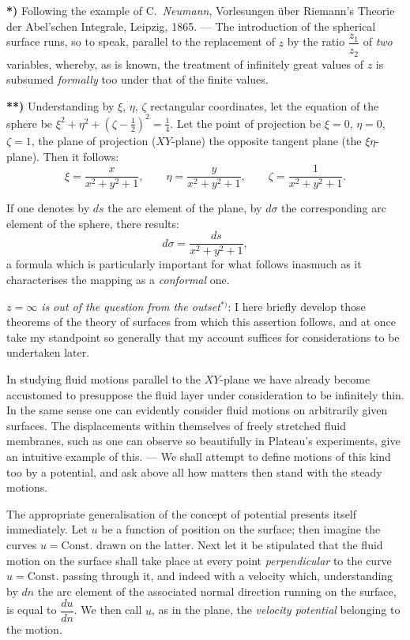 \documentclass{article}
\begin{document}
\textbf{*)} Following the example of C.\ \emph{Neumann}, Vorlesungen über Riemann's Theorie der Abel'schen Integrale, Leipzig, 1865. --- The introduction of the spherical surface runs, so to speak, parallel to the replacement of $z$ by the ratio $\dfrac{z_{1}}{z_{2}}$ of \emph{two} variables, whereby, as is known, the treatment of infinitely great values of $z$ is subsumed \emph{formally} too under that of the finite values.

\textbf{**)} Understanding by $\xi$, $\eta$, $\zeta$ rectangular coordinates, let the equation of the sphere be $\xi^{2} + \eta^{2} + (\zeta - \frac{1}{2})^{2} = \frac{1}{4}$. Let the point of projection be $\xi = 0$, $\eta = 0$, $\zeta = 1$, the plane of projection ($XY$-plane) the opposite tangent plane (the $\xi\eta$-plane). Then it follows:
\[ \xi = \frac{x}{x^{2} + y^{2} + 1}, \qquad \eta = \frac{y}{x^{2} + y^{2} + 1}, \qquad \zeta = \frac{1}{x^{2} + y^{2} + 1}. \]

If one denotes by $ds$ the arc element of the plane, by $d\sigma$ the corresponding arc element of the sphere, there results:
\[ d\sigma = \frac{ds}{x^{2} + y^{2} + 1}, \]
a formula which is particularly important for what follows inasmuch as it characterises the mapping as a \emph{conformal} one.

\emph{$z = \infty$ is out of the question from the outset}${}^{*)}$: I here briefly develop those theorems of the theory of surfaces from which this assertion follows, and at once take my standpoint so generally that my account suffices for considerations to be undertaken later.

In studying fluid motions parallel to the $XY$-plane we have already become accustomed to presuppose the fluid layer under consideration to be infinitely thin. In the same sense one can evidently consider fluid motions on arbitrarily given surfaces. The displacements within themselves of freely stretched fluid membranes, such as one can observe so beautifully in Plateau's experiments, give an intuitive example of this. --- We shall attempt to define motions of this kind too by a potential, and ask above all how matters then stand with the steady motions.

The appropriate generalisation of the concept of potential presents itself immediately. Let $u$ be a function of position on the surface; then imagine the curves $u = \text{Const.}$ drawn on the latter. Next let it be stipulated that the fluid motion on the surface shall take place at every point \emph{perpendicular} to the curve $u = \text{Const.}$ passing through it, and indeed with a velocity which, understanding by $dn$ the arc element of the associated normal direction running on the surface, is equal to $\dfrac{du}{dn}$. We then call $u$, as in the plane, the \emph{velocity potential} belonging to the motion.
\end{document}
